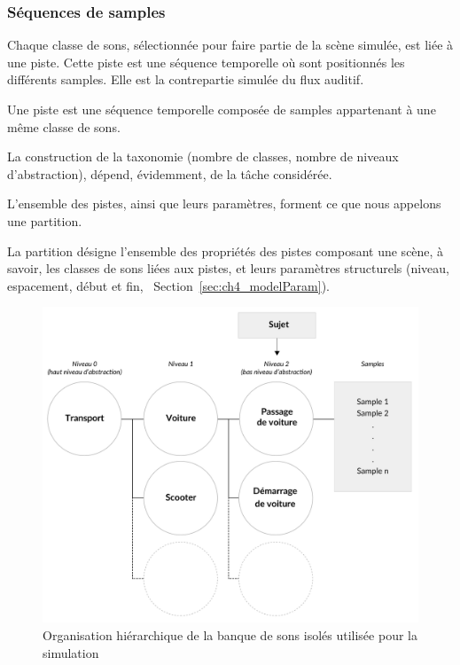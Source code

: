 \subsubsection{Séquences de samples}
\label{sec:ch4_seqSample}

Chaque classe de sons, sélectionnée pour faire partie de la scène simulée, est liée à une piste. Cette piste est une séquence temporelle où sont positionnés les différents samples. Elle est la contrepartie simulée du flux auditif.

\begin{mydef}
Une piste est une séquence temporelle composée de samples appartenant à une même classe de sons.
\end{mydef}

La construction de la taxonomie (nombre de classes, nombre de niveaux d'abstraction), dépend, évidemment, de la tâche considérée. 

L'ensemble des pistes, ainsi que leurs paramètres, forment ce que nous appelons une partition.

\begin{mydef}
La partition désigne l'ensemble des propriétés des pistes composant une scène, à savoir, les classes de sons liées aux pistes, et leurs paramètres structurels (niveau, espacement, début et fin, \cf~Section~\ref{sec:ch4_modelParam}).
\end{mydef}

\begin{figure}[t]
        \myfloatalign
        \includegraphics[width=.8\linewidth]{gfx/ch_4/3}
       \caption{Organisation hiérarchique de la banque de sons isolés utilisée pour la simulation}\label{fig:orgDb}
\end{figure}

